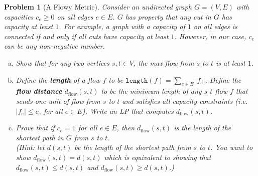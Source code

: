 \documentclass[10pt]{article}
\newtheorem{problem}{\sc\color{cit}Problem}
\begin{document}
\newpage



\begin{problem}[A Flowy Metric]
Consider an undirected graph $G = (V, E)$ with capacities $c_e\ge 0$ on all edges $e \in E$. $G$ has property that any cut in $G$ has capacity at least $1$. For example, a graph with a capacity of $1$ on all edges is connected if and only if all cuts have capacity at least $1$. However, in our case, $c_e$ can be any non-negative number.
\begin{enumerate}[(a)]
    \item Show that for any two vertices $s, t \in V$, the max flow from $s$ to $t$ is at least $1$.
    \item Define the \textbf{length} of a flow $f$ to be $\texttt{length}(f) = \sum_{e\in E} |f_e|$. Define the \textbf{flow distance} $d_{\text{flow}} (s,t)$ to be the minimum length of any $s$-$t$ flow $f$ that sends one unit of flow from $s$ to $t$ and satisfies all capacity constraints (i.e. $|f_e|\le c_e$ for all $e \in E$). Write an LP that computes $d_{\text{flow}} (s,t)$. 
    \item Prove that if $c_e = 1$ for all $e\in E$, then $d_{\text{flow}} (s,t)$ is the length of the shortest path in $G$ from $s$ to $t$. \\
    (Hint: let $d(s,t)$ be the length of the shortest path from $s$ to $t$. You want to show $d_{\text{flow}} (s,t) = d(s,t)$ which is equivalent to showing that $d_{\text{flow}} (s,t) \le d(s,t)$ and $d_{\text{flow}} (s,t) \ge d(s,t)$.)
\end{enumerate}
\end{problem}
\end{document}
